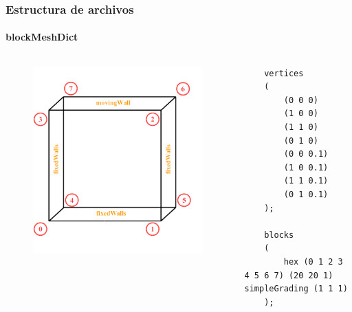 \begin{frame}[fragile]
    \frametitle{Estructura de archivos}
    \framesubtitle{blockMeshDict}

\vspace{-0.8cm}
    \begin{columns}
        
            \begin{figure}
                \centering
                \includegraphics[scale=0.2]{Imagenes/Cavity/cavity_2}
            \end{figure}
\vspace{-0.8cm}            
            \tiny
            \begin{verbatim}
    vertices
    (
        (0 0 0)
        (1 0 0)
        (1 1 0)
        (0 1 0)
        (0 0 0.1)
        (1 0 0.1)
        (1 1 0.1)
        (0 1 0.1)
    );
              
    blocks
    (
        hex (0 1 2 3 4 5 6 7) (20 20 1) simpleGrading (1 1 1)
    );        
            \end{verbatim}
        

\end{columns}
\end{frame}
